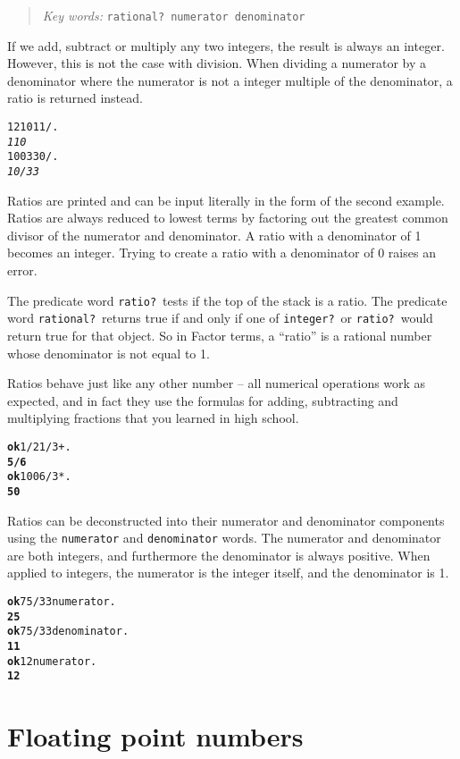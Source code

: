 \documentclass[english]{book}
\newcommand{\chapkeywords}[1]{%
\begin{quote}
\emph{Key words:} \texttt{#1}
\end{quote}
}
\begin{document}
\chapkeywords{rational?~numerator denominator}

If we add, subtract or multiply any two integers, the result is always an integer. However, this is not the case with division. When dividing a numerator by a denominator where the numerator is not a integer multiple of the denominator, a ratio is returned instead.

\begin{alltt}
1210 11 / .
\emph{110}
100 330 / .
\emph{10/33}
\end{alltt}

Ratios are printed and can be input literally in the form of the second example. Ratios are always reduced to lowest terms by factoring out the greatest common divisor of the numerator and denominator. A ratio with a denominator of 1 becomes an integer. Trying to create a ratio with a denominator of 0 raises an error.

The predicate word \texttt{ratio?}~tests if the top of the stack is a ratio. The predicate word \texttt{rational?}~returns true if and only if one of \texttt{integer?}~or \texttt{ratio?}~would return true for that object. So in Factor terms, a ``ratio'' is a rational number whose denominator is not equal to 1.

Ratios behave just like any other number -- all numerical operations work as expected, and in fact they use the formulas for adding, subtracting and multiplying fractions that you learned in high school.

\begin{alltt}
\textbf{ok} 1/2 1/3 + .
\textbf{5/6}
\textbf{ok} 100 6 / 3 * .
\textbf{50}
\end{alltt}

Ratios can be deconstructed into their numerator and denominator components using the \texttt{numerator} and \texttt{denominator} words. The numerator and denominator are both integers, and furthermore the denominator is always positive. When applied to integers, the numerator is the integer itself, and the denominator is 1.

\begin{alltt}
\textbf{ok} 75/33 numerator .
\textbf{25}
\textbf{ok} 75/33 denominator .
\textbf{11}
\textbf{ok} 12 numerator .
\textbf{12}
\end{alltt}

\section{Floating point numbers}
\end{document}
